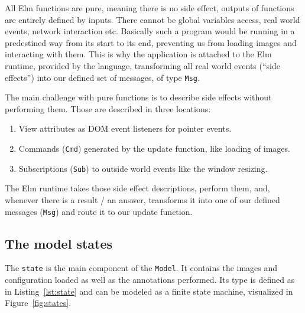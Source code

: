 All Elm functions are pure, meaning there is no side effect,
outputs of functions are entirely defined by inputs.
There cannot be global variables access,
real world events, network interaction etc.
Basically such a program would be running in a predestined way
from its start to its end,
preventing us from loading images and interacting with them.
This is why the application is attached to the Elm runtime,
provided by the language, transforming all real world events (``side effects'')
into our defined set of messages, of type \verb|Msg|.

The main challenge with pure functions is
to describe side effects without performing them.
Those are described in three locations:

\begin{enumerate}
\item View attributes as DOM event listeners for pointer events.
\item Commands (\verb|Cmd|) generated by the update function, like loading of images.
\item Subscriptions (\verb|Sub|) to outside world events like the window resizing.
\end{enumerate}

The Elm runtime takes those side effect descriptions,
perform them, and, whenever there is a result / an answer,
transforms it into one of our defined messages (\verb|Msg|)
and route it to our update function.


\subsection{The model states}

The \verb|state| is the main component of the \verb|Model|.
It contains the images and configuration loaded as well as the annotations performed.
Its type is defined as in Listing~\ref{lst:state}
and can be modeled as a finite state machine, visualized in Figure~\ref{fig:states}.



